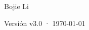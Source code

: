 \begin{titlepage}
\vfill
{\LARGE\sffamily Bojie Li\par}
\vspace{0.7cm}
{\small\sffamily\color{structurecolor!80} Versión v3.0 · \today\par}
\vspace{1.2cm}
\end{titlepage}
